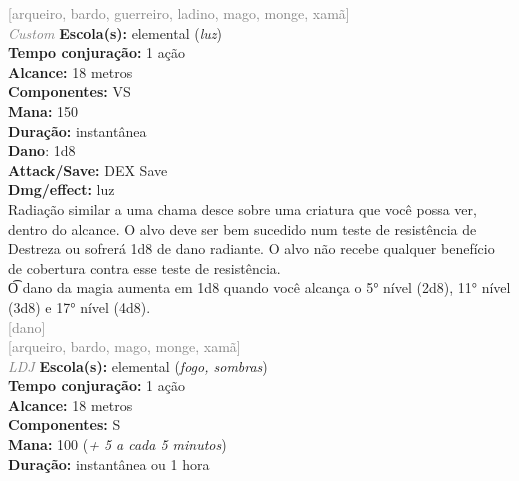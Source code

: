 \documentclass{RPG_Adventure}[2021/10/20]
\begin{document}
{\scriptsize \textcolor{gray}{[arqueiro, bardo, guerreiro, ladino, mago, monge, xamã]\\}}
{\tiny \textcolor{gray}{\textit{Custom}}}\jump{}
{\small \t \textbf{Escola(s):} elemental (\textit{luz})\\\t \textbf{Tempo conjuração:} 1 ação\\\t \textbf{Alcance:} 18 metros\\\t \textbf{Componentes:} VS\\\t \textbf{Mana:} 150\\\t \textbf{Duração:} instantânea\\\t \textbf{Dano}: 1d8\\\t \textbf{Attack/Save:} DEX Save\\\t \textbf{Dmg/effect:} luz\\}
{\normalsize Radiação similar a uma chama desce sobre uma criatura que você possa ver, dentro do alcance. O alvo deve ser bem sucedido num teste de resistência de Destreza ou sofrerá 1d8 de dano radiante. O alvo não recebe qualquer benefício de cobertura contra esse teste de resistência.\\\t O dano da magia aumenta em 1d8 quando você alcança o 5° nível (2d8), 11° nível (3d8) e 17° nível (4d8).\\}
{\scriptsize \textcolor{gray}{[dano]\\}}
{\scriptsize \textcolor{gray}{[arqueiro, bardo, mago, monge, xamã]\\}}
{\tiny \textcolor{gray}{\textit{LDJ}}}\jump{}
{\small \t \textbf{Escola(s):} elemental (\textit{fogo, sombras})\\\t \textbf{Tempo conjuração:} 1 ação\\\t \textbf{Alcance:} 18 metros\\\t \textbf{Componentes:} S\\\t \textbf{Mana:} 100 (\textit{+ 5 a cada 5 minutos})\\\t \textbf{Duração:} instantânea ou 1 hora\\}
\end{document}
